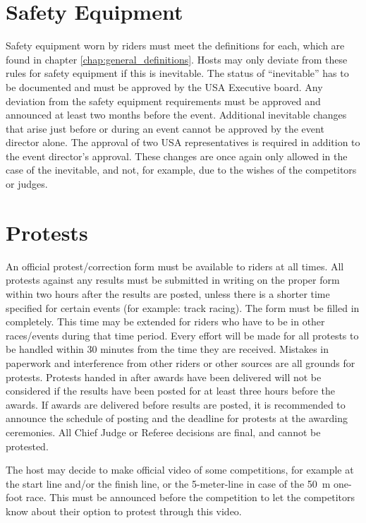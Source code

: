 \section{Safety Equipment}

Safety equipment worn by riders must meet the definitions for each, which are found in chapter \ref{chap:general_definitions}.
Hosts may only deviate from these rules for safety equipment if this is inevitable.
The status of ``inevitable'' has to be documented and must be approved by the USA Executive board.
Any deviation from the safety equipment requirements must be approved and announced at least two months before the event.
Additional inevitable changes that arise just before or during an event cannot be approved by the event director alone.
The approval of two USA representatives is required in addition to the event director's approval.
These changes are once again only allowed in the case of the inevitable, and not, for example, due to the wishes of the competitors or judges.

\section{Protests}
An official protest/correction form must be available to riders at all times.
All protests against any results must be submitted in writing on the proper form within two hours after the results are posted, unless there is a shorter time specified for certain events (for example: track racing).
The form must be filled in completely.
This time may be extended for riders who have to be in other races/events during that time period.
Every effort will be made for all protests to be handled within 30 minutes from the time they are received.
Mistakes in paperwork and interference from other riders or other sources are all grounds for protests.
Protests handed in after awards have been delivered will not be considered if the results have been posted for at least three hours before the awards.
If awards are delivered before results are posted, it is recommended to announce the schedule of posting and the deadline for protests at the awarding ceremonies.
All Chief Judge or Referee decisions are final, and cannot be protested.

The host may decide to make official video of some competitions, for example at the start line and/or the finish line, or the 5-meter-line in case of the 50~m one-foot race.
This must be announced before the competition to let the competitors know about their option to protest through this video.

